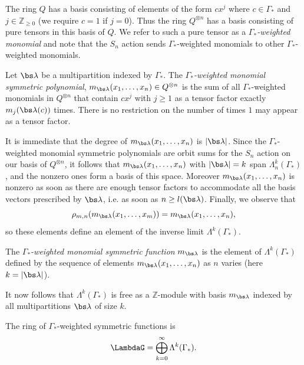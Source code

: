 The ring $Q$ has a basis consisting of elements of the form $c x^j$ where $c \in \Gamma_*$ and $j \in \mathbb{Z}_{\geq 0}$ (we require $c = 1$ if $j=0$). Thus the ring $Q^{\otimes n}$ has a basis consisting of pure tensors in this basis of $Q$. We refer to such a pure tensor as a \emph{$\Gamma_*$-weighted monomial} and note that the $S_n$ action sends $\Gamma_*$-weighted monomials to other $\Gamma_*$-weighted monomials.
\begin{definition}
Let $\bs \lambda$ be a multipartition indexed by $\Gamma_*$. The \emph{$\Gamma_*$-weighted monomial symmetric polynomial}, $m_{\bs \lambda}(x_1, \ldots, x_n) \in Q^{\otimes n}$ is the sum of all $\Gamma_*$-weighted monomials in $Q^{\otimes n}$ that contain $c x^j$ with $j \geq 1$ as a tensor factor exactly $m_j(\bs \lambda(c))$ times. There is no restriction on the number of times $1$ may appear as a tensor factor.
\end{definition}

It is immediate that the degree of $m_{\bs\lambda}(x_1, \ldots, x_n)$ is $|\bs\lambda|$. Since the $\Gamma_*$-weighted monomial symmetric polynomials are orbit sums for the $S_n$ action on our basis of $Q^{\otimes n}$, it follows that $m_{\bs\lambda}(x_1, \ldots, x_n)$ with $|\bs\lambda|=k$ span $\Lambda_{n}^k(\Gamma_*)$, and the nonzero ones form a basis of this space. Moreover $m_{\bs\lambda}(x_1, \ldots, x_n)$ is nonzero as soon as there are enough tensor factors to accommodate all the basis vectors prescribed by $\bs \lambda$, i.e. as soon as $n \geq l(\bs\lambda)$. Finally, we observe that
\[
\rho_{m,n}(m_{\bs\lambda}(x_1,\ldots, x_m)) = m_{\bs\lambda}(x_1,\ldots, x_n),
\]
so these elements define an element of the inverse limit $\Lambda^k(\Gamma_*)$.
\begin{definition}
The \emph{$\Gamma_*$-weighted monomial symmetric function} $m_{\bs\lambda}$ is the element of $\Lambda^k(\Gamma_*)$ defined by the sequence of elements $m_{\bs\lambda}(x_1, \dots, x_n)$ as $n$ varies \textup{(}here $k = |\bs\lambda|$\textup{)}.
\end{definition}

It now follows that $\Lambda^k(\Gamma_*)$ is free as a $\mathbb{Z}$-module with basis $m_{\bs\lambda}$ indexed by all multipartitions $\bs\lambda$ of size $k$.
\begin{definition}
The ring of $\Gamma_*$-weighted symmetric functions is
\[
\LambdaG = \bigoplus_{k=0}^{\infty} \Lambda^k(\Gamma_*).
\]
\end{definition}

